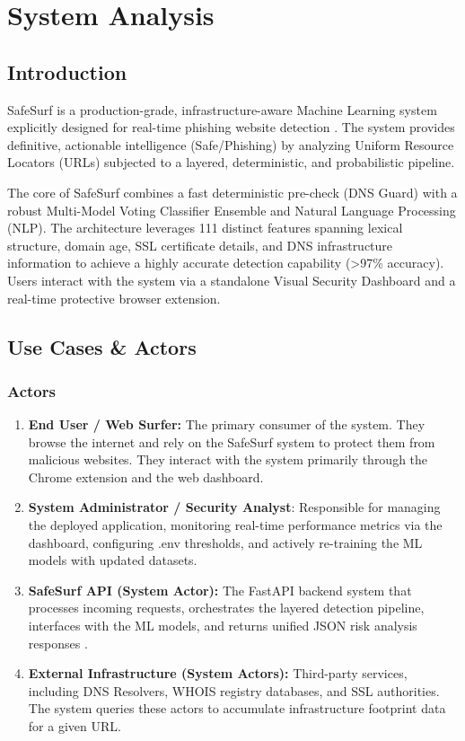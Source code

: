 \chapter{System Analysis}
\section{Introduction}
SafeSurf is a production-grade, infrastructure-aware Machine Learning system explicitly designed for real-time phishing website detection \cite{ref1}. The system provides definitive, actionable intelligence (Safe/Phishing) by analyzing Uniform Resource Locators (URLs) subjected to a layered, deterministic, and probabilistic pipeline. 

The core of SafeSurf combines a fast deterministic pre-check (DNS Guard) with a robust Multi-Model Voting Classifier Ensemble and Natural Language Processing (NLP). The architecture leverages 111 distinct features spanning lexical structure, domain age, SSL certificate details, and DNS infrastructure information to achieve a highly accurate detection capability (>97\% accuracy). Users interact with the system via a standalone Visual Security Dashboard and a real-time protective browser extension.
\section{Use Cases \&  Actors}
\subsection{Actors}
\begin{enumerate}
    \item \textbf{End User / Web Surfer:} The primary consumer of the system. They browse the internet and rely on the SafeSurf system to protect them from malicious websites. They interact with the system primarily through the Chrome extension and the web dashboard.
    \item \textbf{System Administrator / Security Analyst}: Responsible for managing the deployed application, monitoring real-time performance metrics via the dashboard, configuring .env thresholds, and actively re-training the ML models with updated datasets.
    \item \textbf{SafeSurf API (System Actor):} The FastAPI backend system that processes incoming requests, orchestrates the layered detection pipeline, interfaces with the ML models, and returns unified JSON risk analysis responses \cite{ref20}.
    \item \textbf{External Infrastructure (System Actors):} Third-party services, including DNS Resolvers, WHOIS registry databases, and SSL authorities. The system queries these actors to accumulate infrastructure footprint data for a given URL.
\end{enumerate}

